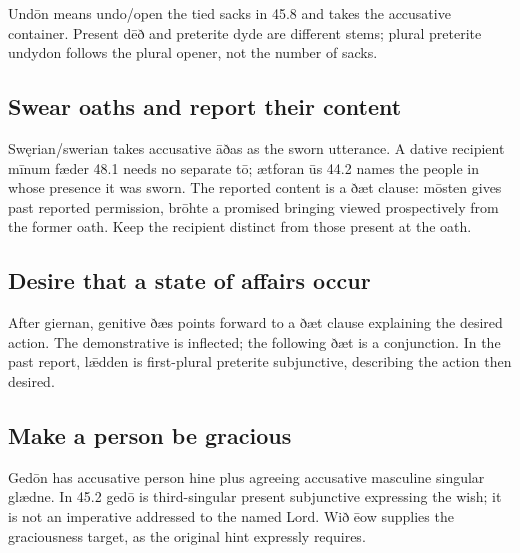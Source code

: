 Undōn means undo/\allowbreak{}open the tied sacks in 45.8 and takes the accusative container. Present dēð and preterite dyde are different stems; plural preterite undydon follows the plural opener, not the number of sacks.

\subsection*{Swear oaths and report their content}

Swęrian/\allowbreak{}swerian takes accusative āðas as the sworn utterance. A dative recipient mīnum fæder 48.1 needs no separate tō; ætforan ūs 44.2 names the people in whose presence it was sworn. The reported content is a ðæt clause: mōsten gives past reported permission, brōhte a promised bringing viewed prospectively from the former oath. Keep the recipient distinct from those present at the oath.

\subsection*{Desire that a state of affairs occur}

After giernan, genitive ðæs points forward to a ðæt clause explaining the desired action. The demonstrative is inflected; the following ðæt is a conjunction. In the past report, lǣdden is first-plural preterite subjunctive, describing the action then desired.

\subsection*{Make a person be gracious}

Gedōn has accusative person hine plus agreeing accusative masculine singular glædne. In 45.2 gedō is third-singular present subjunctive expressing the wish; it is not an imperative addressed to the named Lord. Wið ēow supplies the graciousness target, as the original hint expressly requires.

